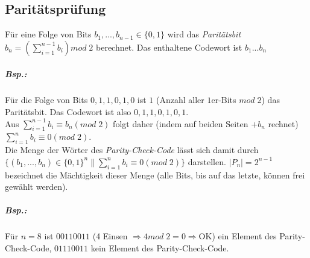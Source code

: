 \subsection{Paritätsprüfung}
Für eine Folge von Bits $b_1,...,b_{n-1}\in \{0,1\}$ wird das \emph{Paritätsbit} $b_n= \left( \sum_{i=1}^{n-1}b_i\right) mod \; 2$ berechnet. Das enthaltene Codewort ist $b_1...b_n$
\subparagraph{Bsp.:} Für die Folge von Bits $0,1,1,0,1,0$ ist $1$ (Anzahl aller $1$er-Bits $mod\;2$) das Paritätsbit. Das Codewort ist also $0,1,1,0,1,0,1$.\medskip\\
Aus $\sum_{i=1}^{n-1}b_i\equiv b_n (mod\; 2)$ folgt daher (indem auf beiden Seiten $+b_n$ rechnet) $\sum_{i=1}^{n}b_i \equiv 0 (mod\;2)$.\\
Die Menge der Wörter des \emph{Parity-Check-Code} lässt sich damit durch $\{(b_1,...,b_n)\in \{0,1\}^n\|\sum_{i=1}^{n}b_i\equiv 0 (mod\; 2)\}$ darstellen. $|P_n|=2^{n-1}$ bezeichnet die Mächtigkeit dieser Menge (alle Bits, bis auf das letzte, können frei gewählt werden).
\subparagraph{Bsp.:} Für $n=8$ ist $00110011$ (4 Einsen $\Rightarrow 4mod \;2=0 \Rightarrow$OK) ein Element des Parity-Check-Code, $01110011$ kein Element des Parity-Check-Code.\\
